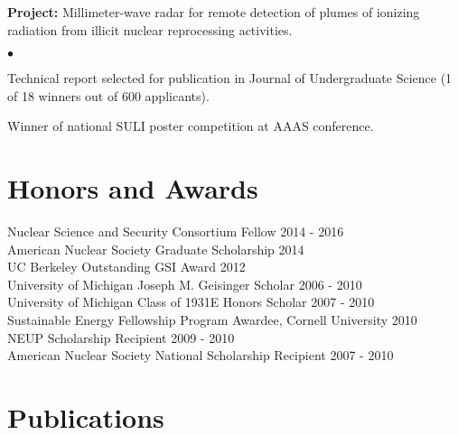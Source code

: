 \documentclass[margin,line]{res}
\let\resumesection\section
\newenvironment{list1}{
  \begin{list}{\ding{113}}{%
      \setlength{\itemsep}{0in}
      \setlength{\parsep}{0in} \setlength{\parskip}{0in}
      \setlength{\topsep}{0in} \setlength{\partopsep}{0in} 
      \setlength{\leftmargin}{0.17in}}}{\end{list}}
\newenvironment{list2}{
  \begin{list}{$\bullet$}{%
      \setlength{\itemsep}{0in}
      \setlength{\parsep}{0in} \setlength{\parskip}{0in}
      \setlength{\topsep}{0in} \setlength{\partopsep}{0in} 
      \setlength{\leftmargin}{0.2in}}}{\end{list}}
\begin{document}
\begin{resume}
\begin{list1}
  \item[] {\bf \small Project:} Millimeter-wave radar for remote detection of
                                plumes of ionizing radiation from illicit
                                nuclear reprocessing activities.
  \begin{list2}
    \item Technical report selected for publication in Journal of Undergraduate
            Science (1 of 18 winners out of 600 applicants).
    \item Winner of national SULI poster competition at AAAS conference.
  \end{list2}
\end{list1}

\section{\sc Honors and Awards} 

Nuclear Science and Security Consortium Fellow \hfill 2014 - 2016 \\
American Nuclear Society Graduate Scholarship \hfill 2014 \\
UC Berkeley Outstanding GSI Award \hfill 2012 \\
University of Michigan Joseph M. Geisinger Scholar \hfill 2006 - 2010 \\
University of Michigan Class of 1931E Honors Scholar \hfill 2007 - 2010 \\
Sustainable Energy Fellowship Program Awardee, Cornell University \hfill 2010 \\
NEUP Scholarship Recipient \hfill 2009 - 2010 \\
American Nuclear Society National Scholarship Recipient \hfill 2007 - 2010 \\

\section{\sc Publications}

\renewcommand{\section}[2]{}
\renewcommand{\section}{\resumesection}


\end{resume}
\end{document}
